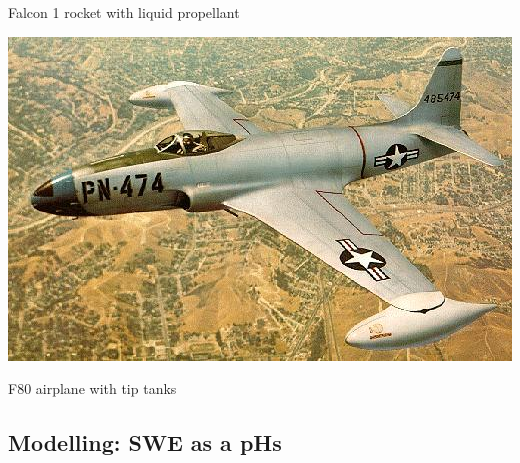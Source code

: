 \documentclass[10pt,aspectratio=43]{ISAE-Beamer}
\begin{document}
{\begin{minipage}[t]{0.48\textwidth}
		\small Falcon 1 rocket with liquid propellant
	\end{minipage}
	\begin{minipage}[t]{0.48\textwidth}
		\centering
		\includegraphics[width=0.8\linewidth]{f80.jpg}
		
		\small
		F80 airplane with tip tanks
	\end{minipage}
	
}


\subsection{Modelling: SWE as a pHs}
\end{document}
